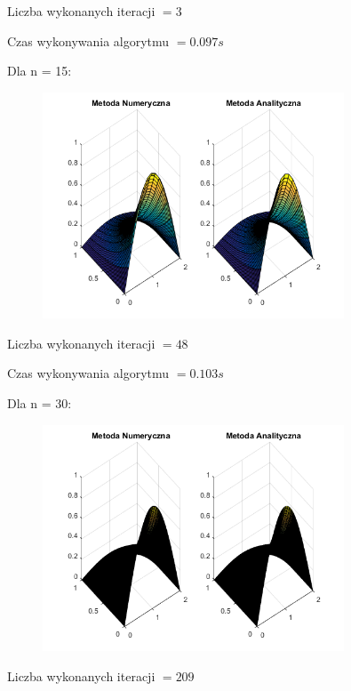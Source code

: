 Liczba wykonanych iteracji $ = 3 $

Czas wykonywania algorytmu $ = 0.097 s$

Dla n = 15:

\begin{figure}[!ht]
	\begin{center}
		\includegraphics[width=0.8\textwidth]{Lab7/charts/rm/15.png}
	\end{center}
\end{figure}

Liczba wykonanych iteracji $ = 48 $

Czas wykonywania algorytmu $ = 0.103 s$

Dla n = 30:

\begin{figure}[!ht]
	\begin{center}
		\includegraphics[width=0.8\textwidth]{Lab7/charts/rm/30.png}
	\end{center}
\end{figure}

Liczba wykonanych iteracji $ = 209 $

